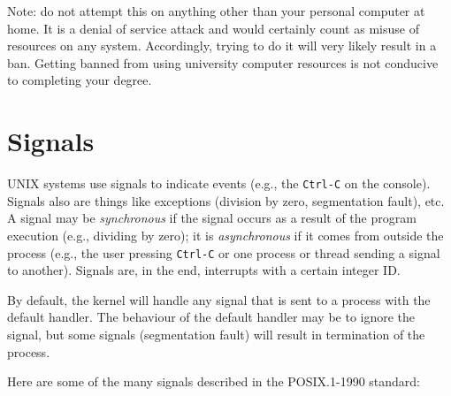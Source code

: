 Note: do not attempt this on anything other than your personal computer at home. It is a denial of service attack and would certainly count as misuse of resources on any system. Accordingly, trying to do it will very likely result in a ban. Getting banned from using university computer resources is not conducive to completing your degree.


\section*{Signals}

UNIX systems use signals to indicate events (e.g., the \texttt{Ctrl-C} on the console). Signals also are things like exceptions (division by zero, segmentation fault), etc. A signal may be \textit{synchronous} if the signal occurs as a result of the program execution (e.g., dividing by zero); it is \textit{asynchronous} if it comes from outside the process (e.g., the user pressing \texttt{Ctrl-C} or one process or thread sending a signal to another). Signals are, in the end, interrupts with a certain integer ID.

By default, the kernel will handle any signal that is sent to a process with the default handler. The behaviour of the default handler may be to ignore the signal, but some signals (segmentation fault) will result in termination of the process.


Here are some of the many signals described in the POSIX.1-1990 standard:

